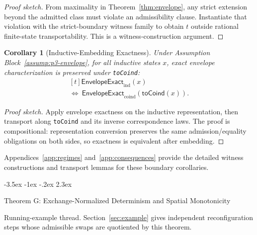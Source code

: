 \documentclass[a4paper,10pt,twocolumn,english]{article}
\makeatletter
\renewcommand{\section}{\@startsection{section}{1}{\z@}%
  {-3.5ex \@plus -1ex \@minus -.2ex}%
  {2.3ex}%
  {\raggedright\normalfont\large\bfseries}}
\numberwithin{equation}{section}
\theoremstyle{paperdef}
\theoremstyle{paperplain}
\newtheorem{corollary}[definition]{Corollary}
\theoremstyle{paperdef}
\theoremstyle{paperremark}
\theoremstyle{paperdef}
\newcommand{\EnvelopeExact}{\ensuremath{\mathsf{EnvelopeExact}}}
\makeatother
\begin{document}
\begin{proof}[Proof sketch]
	From maximality in Theorem~\ref{thm:envelope}, any strict extension beyond the
	admitted class must violate an admissibility clause. Instantiate that violation
	with the strict-boundary witness family to obtain $t$ outside rational finite-state
	transportability. This is a witness-construction argument.
\end{proof}

\begin{corollary}[Inductive-Embedding Exactness]
	\label{cor:embedding}
	Under Assumption Block~\ref{assump:p3-envelope}, for all inductive states $x$, exact envelope characterization is preserved under \texttt{toCoind}:
	\begin{equation}
		\begin{aligned}[t]
			\EnvelopeExact_{\mathrm{ind}}(x)
			\\
			\iff\ \EnvelopeExact_{\mathrm{coind}}(\mathsf{toCoind}(x)).
		\end{aligned}
	\end{equation}
\end{corollary}

\begin{proof}[Proof sketch]
	Apply envelope exactness on the inductive representation, then transport along
	\texttt{toCoind} and its inverse correspondence laws. The proof is compositional:
	representation conversion preserves the same admission/equality obligations on
	both sides, so exactness is equivalent after embedding.
\end{proof}

Appendices~\ref{app:regimes} and~\ref{app:consequences} provide the detailed witness constructions and transport lemmas for these boundary corollaries.

\section{Theorem G: Exchange-Normalized Determinism and Spatial Monotonicity}
\label{sec:theorem-g}

Running-example thread. Section~\ref{sec:example} gives independent
reconfiguration steps whose admissible swaps are quotiented by this theorem.
\end{document}
